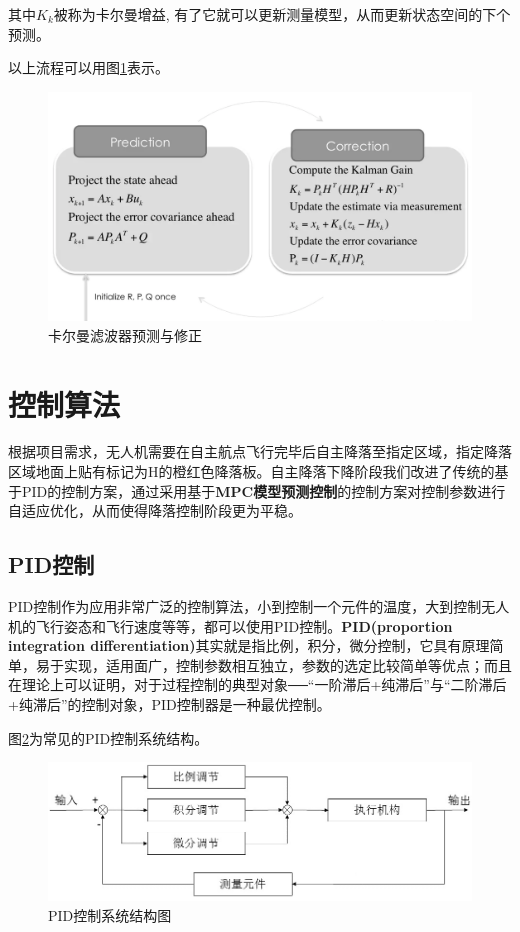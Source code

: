 其中$K_{k}$被称为卡尔曼增益, 有了它就可以更新测量模型，从而更新状态空间的下个预测。

以上流程可以用图\ref{Fig:img3}表示。

\begin{figure}[ht]
  \centering
  \includegraphics[width=0.8\linewidth]{./Figure/Kalman_Prediction_and_Correction.png}
  \caption{卡尔曼滤波器预测与修正}\label{Fig:img3}
\end{figure}

\section{控制算法}

根据项目需求，无人机需要在自主航点飞行完毕后自主降落至指定区域，指定降落区域地面上贴有标记为H的橙红色降落板。自主降落下降阶段我们改进了传统的基于PID的控制方案，通过采用基于\textbf{MPC模型预测控制}的控制方案对控制参数进行自适应优化，从而使得降落控制阶段更为平稳。

\subsection{PID控制}

PID控制作为应用非常广泛的控制算法，小到控制一个元件的温度，大到控制无人机的飞行姿态和飞行速度等等，都可以使用PID控制。\textbf{PID(proportion integration differentiation)}其实就是指比例，积分，微分控制，它具有原理简单，易于实现，适用面广，控制参数相互独立，参数的选定比较简单等优点；而且在理论上可以证明，对于过程控制的典型对象──“一阶滞后+纯滞后”与“二阶滞后+纯滞后”的控制对象，PID控制器是一种最优控制\cite{ArtE2}。

图\ref{Fig:img4}为常见的PID控制系统结构。

\begin{figure}[ht]
  \centering
  \includegraphics[width=0.8\linewidth]{./Figure/PID_Graph.png}
  \caption{PID控制系统结构图}\label{Fig:img4}
\end{figure}

